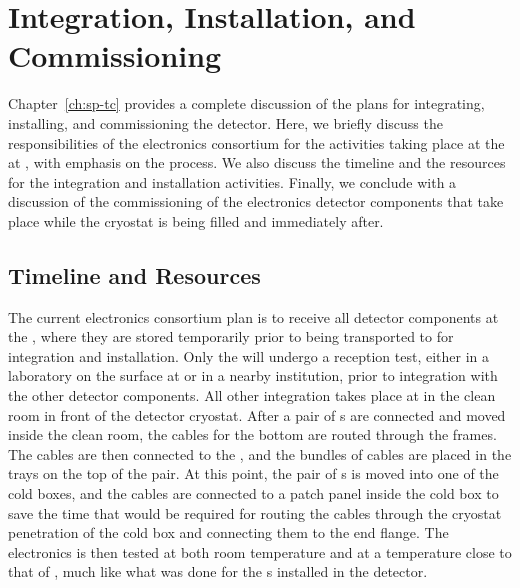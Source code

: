 \section{Integration, Installation, and Commissioning}
\label{sec:fdsp-tpcelec-integration}

Chapter~\ref{ch:sp-tc} provides a complete discussion of the plans for 
integrating, installing, and commissioning the detector.
Here, we briefly discuss the responsibilities of the  electronics
consortium for the activities taking place at the
at , with emphasis on
the  process. We also discuss the timeline
and the resources for the integration and installation activities.
Finally, we conclude with a discussion of the commissioning
of the  electronics detector components that take place while
the cryostat is being filled and immediately after. 

\subsection{Timeline and Resources}
\label{sec:fdsp-tpcelec-integration-timeline}

The current  electronics consortium plan is to receive all detector 
components at the , where they are stored temporarily
prior to being transported to  for integration and 
installation. Only the  will undergo a reception test,
either in a laboratory on the surface at  or in a nearby
institution, prior to integration with the other  
detector components. All other integration takes place at  in the clean room
in front of the detector cryostat. After a pair of s are 
connected and moved inside the clean room, the  cables
for the bottom  are routed through the  frames.
The cables are then connected to the , and the bundles
of cables are placed in the trays on the top of the  pair.
At this point, the pair of s is moved into one of the cold
boxes, and the cables are connected to a patch panel inside the cold box
to save the time that would be required for routing the cables through the cryostat
penetration of the cold box and connecting them to the end flange.
The  electronics is then tested at both room temperature
and at a temperature close to that of \lntwo, much like
what was done for the s installed in the  detector.

